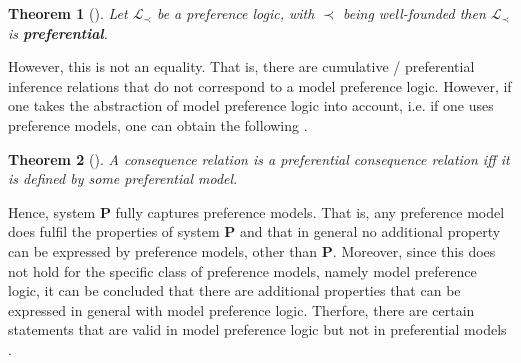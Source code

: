 \documentclass{article}
\newtheorem{thm}{Theorem}[section]
\begin{document}
\begin{thm}[\cite{kraus1990nonmonotonic}]
Let  $\mathcal{L}_{\prec}$ be a preference logic, with $\prec$ being well-founded then $\mathcal{L}_{\prec}$ is \textbf{preferential}.  
\end{thm} 

However, this is not an equality. That is, there are cumulative / preferential inference relations that do not correspond to a model preference logic.
However, if one takes the abstraction of model preference logic into account, i.e. if one uses preference models, one can obtain the following \cite{kraus1990nonmonotonic,brewka1997nonmonotonic}.

\begin{thm}[\cite{kraus1990nonmonotonic}]
A consequence relation is a preferential consequence relation iff it is defined by some
preferential model.
\end{thm} 

Hence, system \textbf{P} fully captures preference models. That is, any preference model does fulfil the properties of system \textbf{P} and that in general no additional property can be expressed by preference models, other than \textbf{P}. Moreover, since this does not hold for the specific class of preference models, namely model preference logic, it can be concluded that there are additional properties that can be expressed in general with model preference logic. Therfore, there are certain statements that are valid in model preference logic but not in preferential models \cite{brewka1997nonmonotonic}.
\end{document}
